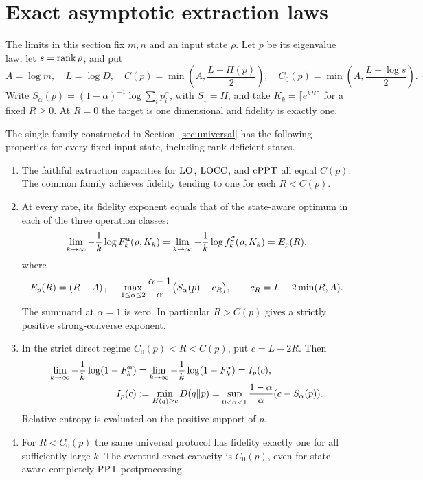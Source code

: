 \section{Exact asymptotic extraction laws}\label{sec:asymptotic}

The limits in this section fix $m,n$ and an input state $\rho$. Let $p$ be its eigenvalue law, let $s=\operatorname{rank}\rho$, and put
\[
 A=\log m,\quad L=\log D,\quad
 C(p)=\min\left(A,\frac{L-H(p)}2\right),\quad
 C_0(p)=\min\left(A,\frac{L-\log s}2\right).
\]
Write $S_\alpha(p)=(1-\alpha)^{-1}\log\sum_i p_i^\alpha$, with $S_1=H$, and take $K_k=\lceil e^{kR}\rceil$ for a fixed $R\ge0$. At $R=0$ the target is one dimensional and fidelity is exactly one.

\begin{theorem}\label{thm:universal-laws}
The single family constructed in Section~\ref{sec:universal} has the following properties for every fixed input state, including rank-deficient states.
\begin{enumerate}
\item The faithful extraction capacities for $\mathrm{LO}$, $\mathrm{LOCC}$, and $\mathrm{cPPT}$ all equal $C(p)$. The common family achieves fidelity tending to one for each $R<C(p)$.
\item At every rate, its fidelity exponent equals that of the state-aware optimum in each of the three operation classes:
\begin{equation}\label{eq:exact-exponent}
 \lim_{k\to\infty}-\frac1k\log F_k^{\rm u}(\rho,K_k)
 =\lim_{k\to\infty}-\frac1k\log f_k^{\mathcal C}(\rho,K_k)
 =E_p(R),
\end{equation}
where
\begin{equation}\label{eq:exponent-formula}
 E_p(R)=(R-A)_++\max_{1\le\alpha\le2}
 \frac{\alpha-1}{\alpha}\bigl(S_\alpha(p)-c_R\bigr),
 \qquad c_R=L-2\min(R,A).
\end{equation}
The summand at $\alpha=1$ is zero. In particular $R>C(p)$ gives a strictly positive strong-converse exponent.
\item In the strict direct regime $C_0(p)<R<C(p)$, put $c=L-2R$. Then
\begin{equation}\label{eq:reliability}
 \begin{aligned}
 \lim_{k\to\infty}-\frac1k\log(1-F_k^{\rm u})
 &=\lim_{k\to\infty}-\frac1k\log(1-F_k^\star)=I_p(c),\\
 I_p(c)&:=\min_{H(q)\ge c}D(q\|p)
 =\sup_{0<\alpha<1}\frac{1-\alpha}{\alpha}(c-S_\alpha(p)).
 \end{aligned}
\end{equation}
Relative entropy is evaluated on the positive support of $p$.
\item For $R<C_0(p)$ the same universal protocol has fidelity exactly one for all sufficiently large $k$. The eventual-exact capacity is $C_0(p)$, even for state-aware completely PPT postprocessing.
\end{enumerate}
\end{theorem}

